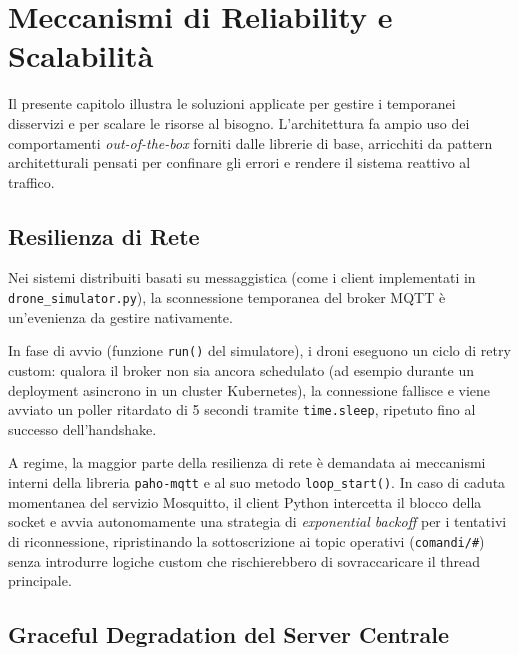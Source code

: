 
\chapter{Meccanismi di Reliability e Scalabilità}
\label{cap:reliability_scalability}

Il presente capitolo illustra le soluzioni applicate per gestire i temporanei disservizi e per scalare le risorse al bisogno. L'architettura fa ampio uso dei comportamenti \emph{out-of-the-box} forniti dalle librerie di base, arricchiti da pattern architetturali pensati per confinare gli errori e rendere il sistema reattivo al traffico.

\section{Resilienza di Rete}
\label{sec:resilienza_rete}

Nei sistemi distribuiti basati su messaggistica (come i client implementati in \texttt{drone\_simulator.py}), la sconnessione temporanea del broker MQTT è un'evenienza da gestire nativamente.

In fase di avvio (funzione \texttt{run()} del simulatore), i droni eseguono un ciclo di retry custom: qualora il broker non sia ancora schedulato (ad esempio durante un deployment asincrono in un cluster Kubernetes), la connessione fallisce e viene avviato un poller ritardato di 5 secondi tramite \texttt{time.sleep}, ripetuto fino al successo dell'handshake.

A regime, la maggior parte della resilienza di rete è demandata ai meccanismi interni della libreria \texttt{paho-mqtt} e al suo metodo \texttt{loop\_start()}. In caso di caduta momentanea del servizio Mosquitto, il client Python intercetta il blocco della socket e avvia autonomamente una strategia di \textit{exponential backoff} per i tentativi di riconnessione, ripristinando la sottoscrizione ai topic operativi (\texttt{comandi/\#}) senza introdurre logiche custom che rischierebbero di sovraccaricare il thread principale.

\section{Graceful Degradation del Server Centrale}
\label{sec:graceful_degradation}

